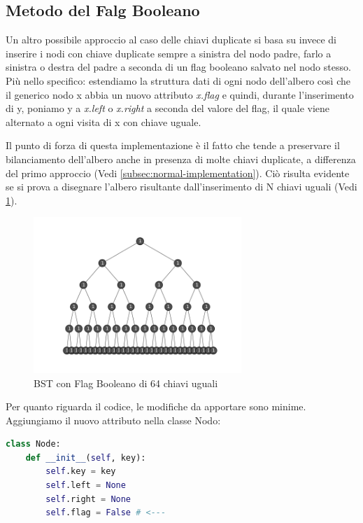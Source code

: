\documentclass{article}
\begin{document}
\subsection{Metodo del Falg Booleano}
\label{subsec:fag-implementation}

Un altro possibile approccio al caso delle chiavi duplicate si basa su invece di inserire i nodi con chiave duplicate sempre a sinistra del nodo padre, farlo a sinistra o destra del padre a seconda di un flag booleano salvato nel nodo stesso. Più nello specifico: estendiamo la struttura dati di ogni nodo dell'albero così che il generico nodo x abbia un nuovo attributo \textit{x.flag} e quindi, durante l'inserimento di y, poniamo y a \textit{x.left} o \textit{x.right} a seconda del valore del flag, il quale viene alternato a ogni visita di x con chiave uguale. 

Il punto di forza di questa implementazione è il fatto che tende a preservare il bilanciamento dell'albero anche in presenza di molte chiavi duplicate, a differenza del primo approccio (Vedi \ref{subsec:normal-implementation}). Ciò risulta evidente se si prova a disegnare l'albero risultante dall'inserimento di N chiavi uguali (Vedi \cref{fig:bst-flag}).



\begin{figure}[H]
  \centering
  \includegraphics[width=0.7\textwidth]{./images/bst-flag}
  \caption{BST con Flag Booleano di 64 chiavi uguali}
  \label{fig:bst-flag}
\end{figure}



Per quanto riguarda il codice, le modifiche da apportare sono minime.
Aggiungiamo il nuovo attributo nella classe Nodo:

\begin{lstlisting}[language=Python, caption={Classe nodo di un BST con Flag Booleano}]
class Node:
    def __init__(self, key):
        self.key = key
        self.left = None
        self.right = None
        self.flag = False # <---
\end{lstlisting}
\end{document}
